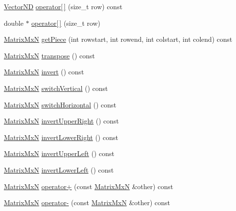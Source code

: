 \begin{DoxyCompactItemize}
\item 
\hyperlink{class_vector_n_d}{Vector\-N\-D} \hyperlink{class_matrix_mx_n_a80906a3f7cdea0f2eb8e710f77cb485b}{operator\mbox{[}$\,$\mbox{]}} (size\-\_\-t row) const 
\item 
double $\ast$ \hyperlink{class_matrix_mx_n_ab98762a2138106995493c1eadaa741ca}{operator\mbox{[}$\,$\mbox{]}} (size\-\_\-t row)
\item 
\hyperlink{class_matrix_mx_n}{Matrix\-Mx\-N} \hyperlink{class_matrix_mx_n_a3fe71291bbb368925ab43a344dccfb70}{get\-Piece} (int rowstart, int rowend, int colstart, int colend) const 
\item 
\hyperlink{class_matrix_mx_n}{Matrix\-Mx\-N} \hyperlink{class_matrix_mx_n_aa300812401ad6cd3e9a5d02889857516}{transpose} () const 
\item 
\hyperlink{class_matrix_mx_n}{Matrix\-Mx\-N} \hyperlink{class_matrix_mx_n_a32b89585c0ad3eb558663b9cd5378c74}{invert} () const 
\item 
\hyperlink{class_matrix_mx_n}{Matrix\-Mx\-N} \hyperlink{class_matrix_mx_n_aeb9e6a36563b05a274d690256a1925a4}{switch\-Vertical} () const 
\item 
\hyperlink{class_matrix_mx_n}{Matrix\-Mx\-N} \hyperlink{class_matrix_mx_n_af253a4e2644ea88bbb6e8f806b7d0623}{switch\-Horizontal} () const 
\item 
\hyperlink{class_matrix_mx_n}{Matrix\-Mx\-N} \hyperlink{class_matrix_mx_n_aaac7eaac505c7e7e973fea07496a1b4e}{invert\-Upper\-Right} () const 
\item 
\hyperlink{class_matrix_mx_n}{Matrix\-Mx\-N} \hyperlink{class_matrix_mx_n_a25c588065de24cdf0c49a5fe1bb2936a}{invert\-Lower\-Right} () const 
\item 
\hyperlink{class_matrix_mx_n}{Matrix\-Mx\-N} \hyperlink{class_matrix_mx_n_a2c3230d1fbbe473c36a41f55e3f1efd9}{invert\-Upper\-Left} () const 
\item 
\hyperlink{class_matrix_mx_n}{Matrix\-Mx\-N} \hyperlink{class_matrix_mx_n_a4647ec26ffd72fceb10a3003dcf6201e}{invert\-Lower\-Left} () const 
\item 
\hyperlink{class_matrix_mx_n}{Matrix\-Mx\-N} \hyperlink{class_matrix_mx_n_a2e49e8ec8b34081eaceeac96d10db260}{operator+} (const \hyperlink{class_matrix_mx_n}{Matrix\-Mx\-N} \&other) const 
\item 
\hyperlink{class_matrix_mx_n}{Matrix\-Mx\-N} \hyperlink{class_matrix_mx_n_a399e59a5b73699465b67b0d296e440ef}{operator-\/} (const \hyperlink{class_matrix_mx_n}{Matrix\-Mx\-N} \&other) const 
\item 

\end{DoxyCompactItemize}
